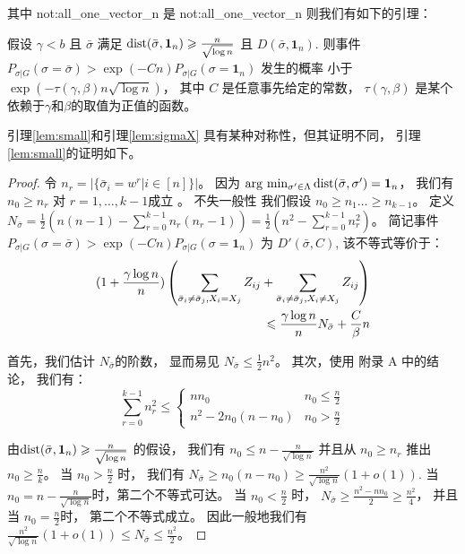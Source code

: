 其中 \gls{not:all_one_vector_n} 是 \glsdesc{not:all_one_vector_n} %
则我们有如下的引理：
 \begin{lemma}\label{lem:small}
	假设 $\gamma < b $ 且 $\bar{\sigma}$
  满足 
  $\Dist(\bar{\sigma}, \mathbf{1}_n) \geq \frac{n}{\sqrt{\log  n}}$
	且 $D(\bar{\sigma}, \mathbf{1}_n)$.
	则事件
	$P_{\sigma | G}(\sigma = \bar{\sigma} ) > \exp(-Cn) P_{\sigma | G}(\sigma = \mathbf{1}_n)$
	发生的概率 小于 $\exp(-\tau(\gamma,\beta) n \sqrt{\log  n} )$，
  其中 $C$ 是任意事先给定的常数，
  $\tau(\gamma,\beta)$ 是某个依赖于$\gamma$和$\beta$的取值为正值的函数。
\end{lemma}
引理\ref{lem:small}和引理\ref{lem:sigmaX} 具有某种对称性，但其证明不同，
引理\ref{lem:small}的证明如下。
\begin{proof}
	令 $n_r = |\{\bar{\sigma}_i = w^r | i\in [n] \}|$。
  因为 $\arg\,\min_{\sigma'\in \Lambda} \Dist(\bar{\sigma}, \sigma') = \mathbf{1}_n$，
  我们有 $n_0 \geq n_r$ 对 $r=1, \dots, k-1$成立 
  。
	不失一般性 我们假设 \mbox{$n_0 \geq n_1 \dots \geq n_{k-1}$}。
	定义
  $N_{\bar{\sigma}} = \frac{1}{2}(n(n-1) - \sum_{r=0}^{k-1} n_r(n_r-1))
	=\frac{1}{2}(n^2 - \sum_{r=0}^{k-1} n_r^2)$。
	简记事件
  $P_{\sigma | G}(\sigma = \bar{\sigma} ) > \exp(-Cn) P_{\sigma | G}(\sigma = \mathbf{1}_n)$ 为
  $D'(\bar{\sigma}, C)$,
	该不等式等价于：
\begin{align}
	(1 + \frac{\gamma \log n}{n})
	\left( \sum_{\bar{\sigma}_i  \neq \bar{\sigma}_j, X_i = X_j} Z_{ij} +
	\sum_{\bar{\sigma}_i  \neq \bar{\sigma}_j, X_i \neq X_j} Z_{ij} \right)\notag\\
	\leq \frac{\gamma \log n}{n} N_{\bar{\sigma}} + \frac{C}{\beta} n\label{eq:small}
\end{align}
		
	首先，我们估计 $N_{\bar{\sigma}}$的阶数，
  显而易见 $N_{\bar{\sigma}} \leq \frac{1}{2} n^2$。
	其次，使用 \citet{chen2016information} 附录 A 中的结论，
  我们有：
\begin{equation}
	\sum_{r=0}^{k-1} n_r^2 \leq
	\begin{cases}
	n n_0 & n_0 \leq \frac{n}{2} \\
	n^2 - 2n_0(n-n_0) & n_0 > \frac{n}{2}
	\end{cases}
	\end{equation}
	
	由$\Dist(\bar{\sigma}, \mathbf{1}_n) \geq \frac{n}{\sqrt{\log n}}$
  的假设，
  我们有 $n_0 \leq n - \frac{n}{\sqrt{\log n}}$
	并且从 $n_0 \geq n_r$ 推出 $n_0 \geq \frac{n}{k}$。
	当 $n_0 > \frac{n}{2}$ 时，
	我们有
  $N_{\bar{\sigma}} \geq n_0 (n - n_0) \geq \frac{n^2}{\sqrt{\log n}}(1+o(1))$.
	当 $n_0 = n - \frac{n}{\sqrt{\log n}}$时，第二个不等式可达。
  当 $n_0 < \frac{n}{2}$ 时，
	$N_{\bar{\sigma}} \geq \frac{n^2 - nn_0}{2} \geq \frac{n^2}{4}$，
  并且当 $n_0 = \frac{n}{2}$时，
  第二个不等式成立。
	因此一般地我们有 $\frac{n^2}{\sqrt{\log n}}(1+o(1)) \leq N_{\bar{\sigma}} \leq \frac{n^2}{2}$。
	

\end{proof}
